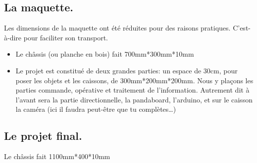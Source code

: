 \subsection{La maquette.}
Les dimensions de la maquette ont été réduites pour des raisons pratiques. C’est-à-dire pour faciliter son transport. 
\begin{itemize}
    \item Le châssis (ou planche en bois) fait 700mm*300mm*10mm
    \item Le projet est constitué de deux grandes parties: un espace de 30cm, pour poser les objets et les caissons, de 300mm*200mm*200mm. Nous y plaçons les parties commande, opérative et traitement de l’information. Autrement dit à l’avant sera la partie directionnelle, la pandaboard, l’arduino, et sur le caisson la  caméra  (ici il faudra peut-être que tu complètes…)
\end{itemize}

\subsection{Le projet final.}
Le châssis fait 1100mm*400*10mm

